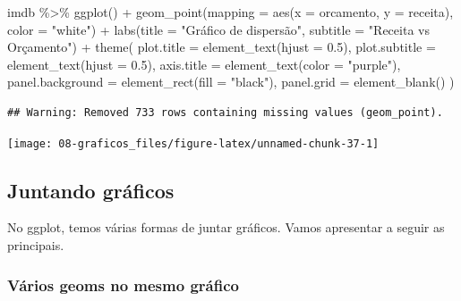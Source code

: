 \documentclass[
]{book}
\newenvironment{Shaded}{\begin{snugshade}}{\end{snugshade}}
\newcommand{\AttributeTok}[1]{\textcolor[rgb]{0.77,0.63,0.00}{#1}}
\newcommand{\FloatTok}[1]{\textcolor[rgb]{0.00,0.00,0.81}{#1}}
\newcommand{\FunctionTok}[1]{\textcolor[rgb]{0.00,0.00,0.00}{#1}}
\newcommand{\NormalTok}[1]{#1}
\newcommand{\SpecialCharTok}[1]{\textcolor[rgb]{0.00,0.00,0.00}{#1}}
\newcommand{\StringTok}[1]{\textcolor[rgb]{0.31,0.60,0.02}{#1}}
\begin{document}
\begin{Shaded}
\begin{Highlighting}[]
\NormalTok{imdb }\SpecialCharTok{\%\textgreater{}\%} 
  \FunctionTok{ggplot}\NormalTok{() }\SpecialCharTok{+}
  \FunctionTok{geom\_point}\NormalTok{(}\AttributeTok{mapping =} \FunctionTok{aes}\NormalTok{(}\AttributeTok{x =}\NormalTok{ orcamento, }\AttributeTok{y =}\NormalTok{ receita), }\AttributeTok{color =} \StringTok{"white"}\NormalTok{) }\SpecialCharTok{+}
  \FunctionTok{labs}\NormalTok{(}\AttributeTok{title =} \StringTok{"Gráfico de dispersão"}\NormalTok{, }\AttributeTok{subtitle =} \StringTok{"Receita vs Orçamento"}\NormalTok{) }\SpecialCharTok{+}
  \FunctionTok{theme}\NormalTok{(}
    \AttributeTok{plot.title =} \FunctionTok{element\_text}\NormalTok{(}\AttributeTok{hjust =} \FloatTok{0.5}\NormalTok{),}
    \AttributeTok{plot.subtitle =} \FunctionTok{element\_text}\NormalTok{(}\AttributeTok{hjust =} \FloatTok{0.5}\NormalTok{),}
    \AttributeTok{axis.title =} \FunctionTok{element\_text}\NormalTok{(}\AttributeTok{color =} \StringTok{"purple"}\NormalTok{),}
    \AttributeTok{panel.background =} \FunctionTok{element\_rect}\NormalTok{(}\AttributeTok{fill =} \StringTok{"black"}\NormalTok{),}
    \AttributeTok{panel.grid =} \FunctionTok{element\_blank}\NormalTok{()}
\NormalTok{  )}
\end{Highlighting}
\end{Shaded}

\begin{verbatim}
## Warning: Removed 733 rows containing missing values (geom_point).
\end{verbatim}

\begin{center}\texttt{[image: 08-graficos\_files/figure-latex/unnamed-chunk-37-1]} \end{center}

\hypertarget{juntando-gruxe1ficos}{%
\subsection{Juntando gráficos}\label{juntando-gruxe1ficos}}

No ggplot, temos várias formas de juntar gráficos. Vamos apresentar a seguir as principais.

\hypertarget{vuxe1rios-geoms-no-mesmo-gruxe1fico}{%
\subsubsection*{Vários geoms no mesmo gráfico}\label{vuxe1rios-geoms-no-mesmo-gruxe1fico}}
\end{document}
